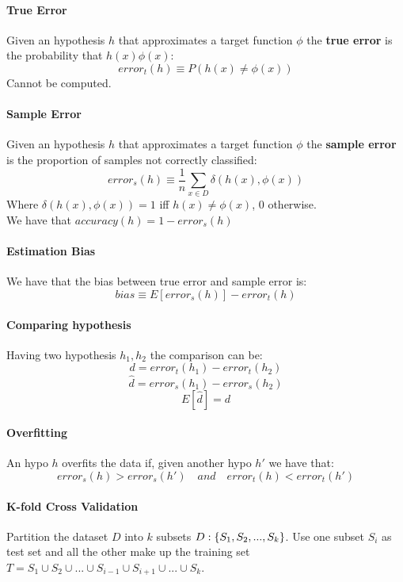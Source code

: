 \paragraph{True Error}
Given an hypothesis $h$ that approximates a target function $\phi $ the \textbf{true error} is the probability that $h(x)  \phi(x)$:
$$error_t(h) \equiv P(h(x)\neq \phi(x))$$
Cannot be computed.

\paragraph{Sample Error}
Given an hypothesis $h$ that approximates a target function $\phi $ the \textbf{sample error} is the proportion of samples not correctly classified:
\[error_s(h) \equiv \frac{1}{n} \sum_{x \in D} \delta(h(x), \phi(x))\]
Where $\delta(h(x), \phi(x))=1$ iff $h(x) \neq \phi(x)$, 0 otherwise.\\
We have that $accuracy(h)=1- error_s(h)$

\paragraph{Estimation Bias}
We have that the bias between true error and sample error is:
\[bias \equiv E[error_s(h)]-error_t(h)\]

\paragraph{Comparing hypothesis}
Having two hypothesis $h_1,h_2$ the comparison can be:
\[d= error_t(h_1)- error_t(h_2)\]
\[\hat{d}= error_s(h_1)- error_s(h_2)\]
\[E[\hat{d}]=d\]

\paragraph{Overfitting}
An hypo $h$ overfits the data if, given another hypo $h'$ we have that:
\[error_s(h)>error_s(h')\quad and\quad error_t(h)< error_t(h')\]


\paragraph{K-fold Cross Validation}
Partition the dataset $D$ into $k$ subsets $D: \lbrace{S_1,S_2,...,S_k}\rbrace$. Use one subset $S_i$ as test set and all the other make up the training set $T=S_1 \cup S_2 \cup...\cup S_{i-1}\cup S_{i+1}\cup ...\cup S_k$.\\

